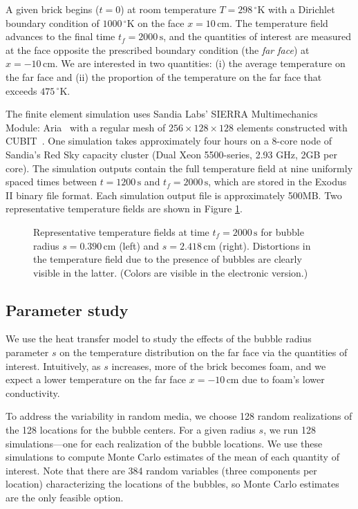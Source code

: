 \documentclass[final]{siamltex}
\begin{document}
A given brick begins ($t=0$) at room temperature
$T=298\,^{\circ}\mathrm{K}$ with a Dirichlet boundary condition of
$1000\,^{\circ}\mathrm{K}$ on the face $x=10\,\mathrm{cm}$. The
temperature field advances to the final time $t_f=2000\,\mathrm{s}$,
and the quantities of interest are measured at the face opposite the
prescribed boundary condition (the \emph{far face}) at
$x=-10\,\mathrm{cm}$. We are interested in two quantities: (i) the
average temperature on the far face and (ii) the proportion of the
temperature on the far face that exceeds $475\,^{\circ}\mathrm{K}$.

The finite element simulation uses Sandia Labs' SIERRA Multimechanics
Module: Aria~\cite{sand07-2734} with a regular mesh of $256\times
128\times 128$ elements constructed with CUBIT~\cite{Blacker1994}. One
simulation takes approximately four hours on a 8-core node of Sandia's
Red Sky capacity cluster (Dual Xeon 5500-series, 2.93 GHz, 2GB per
core).  The simulation outputs contain the full temperature field at
nine uniformly spaced times between $t=1200\,\mathrm{s}$ and
$t_f=2000\,\mathrm{s}$, which are stored in the Exodus II binary file
format. Each simulation output file is approximately 500MB. Two
representative temperature fields are shown in Figure \ref{fig:brick}.

\begin{figure}[t]
\centering
{}\;
\caption{Representative temperature fields at time
  $t_f=2000\,\mathrm{s}$ for bubble radius $s=0.390\,\mathrm{cm}$
  (left) and $s=2.418\,\mathrm{cm}$ (right). Distortions in the
  temperature field due to the presence of bubbles are clearly visible
  in the latter. (Colors are visible in the electronic version.) }
\label{fig:brick}
\end{figure} 

\subsection{Parameter study}
\label{sec:uqstudy}
We use the heat transfer model to study the effects of the bubble
radius parameter $s$ on the temperature distribution on the far face
via the quantities of interest. Intuitively, as $s$ increases, more of
the brick becomes foam, and we expect a lower temperature on the far
face $x=-10\,\mathrm{cm}$ due to foam's lower conductivity.

To address the variability in random media, we choose 128 random
realizations of the 128 locations for the bubble centers. For a given
radius $s$, we run 128 simulations---one for each realization of the
bubble locations. We use these simulations to compute Monte Carlo
estimates of the mean of each quantity of interest.  Note that there
are 384 random variables (three components per location)
characterizing the locations of the bubbles, so Monte Carlo estimates
are the only feasible option.
\end{document}
